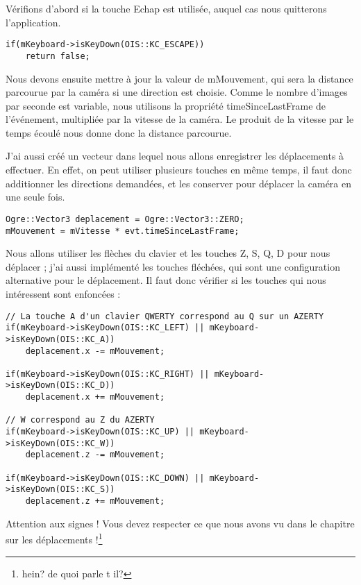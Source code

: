 Vérifions d'abord si la touche Echap est utilisée, auquel cas nous quitterons l'application.


\begin{lstlisting}[caption={}]
if(mKeyboard->isKeyDown(OIS::KC_ESCAPE))
    return false;
\end{lstlisting}

Nous devons ensuite mettre à jour la valeur de mMouvement, qui sera la distance parcourue par la caméra si une direction est choisie. Comme le nombre d'images par seconde est variable, nous utilisons la propriété timeSinceLastFrame de l'événement, multipliée par la vitesse de la caméra. Le produit de la vitesse par le temps écoulé nous donne donc la distance parcourue.

J'ai aussi créé un vecteur dans lequel nous allons enregistrer les déplacements à effectuer. En effet, on peut utiliser plusieurs touches en même temps, il faut donc additionner les directions demandées, et les conserver pour déplacer la caméra en une seule fois.


\begin{lstlisting}[caption={}]
Ogre::Vector3 deplacement = Ogre::Vector3::ZERO;
mMouvement = mVitesse * evt.timeSinceLastFrame;
\end{lstlisting}

Nous allons utiliser les flèches du clavier et les touches Z, S, Q, D pour nous déplacer ; j'ai aussi implémenté les touches fléchées, qui sont une configuration alternative pour le déplacement. Il faut donc vérifier si les touches qui nous intéressent sont enfoncées :


\begin{lstlisting}[caption={}]
// La touche A d'un clavier QWERTY correspond au Q sur un AZERTY
if(mKeyboard->isKeyDown(OIS::KC_LEFT) || mKeyboard->isKeyDown(OIS::KC_A)) 
    deplacement.x -= mMouvement;

if(mKeyboard->isKeyDown(OIS::KC_RIGHT) || mKeyboard->isKeyDown(OIS::KC_D))
    deplacement.x += mMouvement;
    
// W correspond au Z du AZERTY
if(mKeyboard->isKeyDown(OIS::KC_UP) || mKeyboard->isKeyDown(OIS::KC_W)) 
    deplacement.z -= mMouvement;

if(mKeyboard->isKeyDown(OIS::KC_DOWN) || mKeyboard->isKeyDown(OIS::KC_S))
    deplacement.z += mMouvement;
\end{lstlisting}

Attention aux signes ! Vous devez respecter ce que nous avons vu dans le chapitre sur les déplacements !\footnote{hein? de quoi parle t il?}


